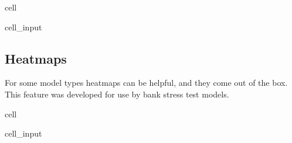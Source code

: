 \documentclass[letterpaper,10pt,english]{jupyterBook}
\begin{document}
\begin{sphinxuseclass}{cell}\begin{sphinxVerbatimInput}

\begin{sphinxuseclass}{cell_input}
\begin{sphinxVerbatim}[commandchars=\\\{\}]
\PYG{p}{[}\PYG{p}{]}\PYGZbs{}
\PYGZbs{}
 
\end{sphinxVerbatim}

\end{sphinxuseclass}\end{sphinxVerbatimInput}

\end{sphinxuseclass}

\subsection{Heatmaps}
\label{\detokenize{content/notebooks/modelflow_features:heatmaps}}
\sphinxAtStartPar
For some model types heatmaps can be helpful, and they come out of the box. This feature was developed for use by bank stress test models.

\begin{sphinxuseclass}{cell}\begin{sphinxVerbatimInput}

\begin{sphinxuseclass}{cell_input}
\begin{sphinxVerbatim}[commandchars=\\\{\}]
 
      \PYG{p}{[}\PYG{p}{]}  
\end{sphinxVerbatim}

\end{sphinxuseclass}\end{sphinxVerbatimInput}

\end{sphinxuseclass}
\sphinxAtStartPar
\end{document}
